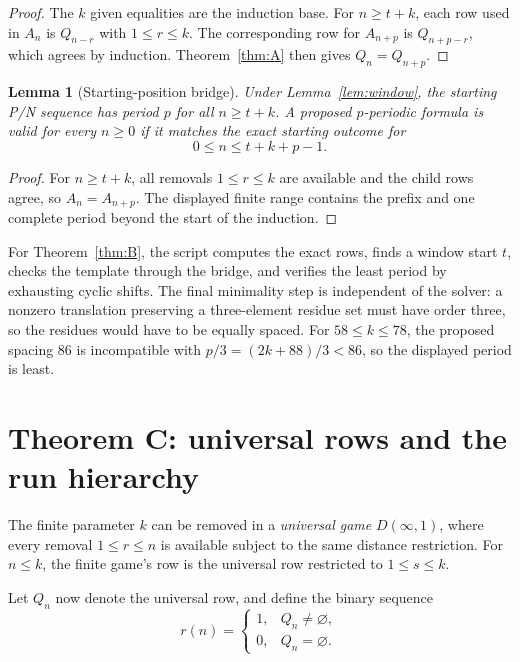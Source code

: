 \documentclass[11pt]{article}
\newtheorem{lemma}[theorem]{Lemma}
\theoremstyle{remark}
\begin{document}
\begin{proof}
The \(k\) given equalities are the induction base. For \(n\ge t+k\), each row used in \(A_n\) is \(Q_{n-r}\) with \(1\le r\le k\). The corresponding row for \(A_{n+p}\) is \(Q_{n+p-r}\), which agrees by induction. Theorem~\ref{thm:A} then gives \(Q_n=Q_{n+p}\).
\end{proof}

\begin{lemma}[Starting-position bridge]\label{lem:bridge}
Under Lemma~\ref{lem:window}, the starting P/N sequence has period \(p\) for all \(n\ge t+k\). A proposed \(p\)-periodic formula is valid for every \(n\ge0\) if it matches the exact starting outcome for
\[
0\le n\le t+k+p-1.
\]
\end{lemma}

\begin{proof}
For \(n\ge t+k\), all removals \(1\le r\le k\) are available and the child rows agree, so \(A_n=A_{n+p}\). The displayed finite range contains the prefix and one complete period beyond the start of the induction.
\end{proof}

For Theorem~\ref{thm:B}, the script computes the exact rows, finds a window start \(t\), checks the template through the bridge, and verifies the least period by exhausting cyclic shifts. The final minimality step is independent of the solver: a nonzero translation preserving a three-element residue set must have order three, so the residues would have to be equally spaced. For \(58\le k\le78\), the proposed spacing \(86\) is incompatible with \(p/3=(2k+88)/3<86\), so the displayed period is least.

\section{Theorem C: universal rows and the run hierarchy}\label{sec:C}

The finite parameter \(k\) can be removed in a \emph{universal game} \(D(\infty,1)\), where every removal \(1\le r\le n\) is available subject to the same distance restriction. For \(n\le k\), the finite game's row is the universal row restricted to \(1\le s\le k\).

Let \(Q_n\) now denote the universal row, and define the binary sequence
\begin{equation}\label{eq:rn}
r(n)=
\begin{cases}
1,&Q_n\ne\varnothing,\\
0,&Q_n=\varnothing.
\end{cases}
\end{equation}
\end{document}
